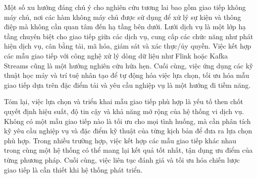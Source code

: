 Một số xu hướng đáng chú ý cho nghiên cứu tương lai bao gồm giao tiếp không máy chủ, nơi các hàm không máy chủ được sử dụng để xử lý sự kiện và thông điệp mà không cần quan tâm đến hạ tầng bên dưới. Lưới dịch vụ là một lớp hạ tầng chuyên biệt cho giao tiếp giữa các dịch vụ, cung cấp các chức năng như phát hiện dịch vụ, cân bằng tải, mã hóa, giám sát và xác thực/ủy quyền. Việc kết hợp các mẫu giao tiếp với công nghệ xử lý dòng dữ liệu như Flink hoặc Kafka Streams cũng là một hướng nghiên cứu hứa hẹn. Cuối cùng, việc ứng dụng các kỹ thuật học máy và trí tuệ nhân tạo để tự động hóa việc lựa chọn, tối ưu hóa mẫu giao tiếp dựa trên đặc điểm tải và yêu cầu nghiệp vụ là một hướng đi tiềm năng.

Tóm lại, việc lựa chọn và triển khai mẫu giao tiếp phù hợp là yếu tố then chốt quyết định hiệu suất, độ tin cậy và khả năng mở rộng của hệ thống vi dịch vụ. Không có một mẫu giao tiếp nào là tối ưu cho mọi tình huống, mà cần phân tích kỹ yêu cầu nghiệp vụ và đặc điểm kỹ thuật của từng kịch bản để đưa ra lựa chọn phù hợp. Trong nhiều trường hợp, việc kết hợp các mẫu giao tiếp khác nhau trong cùng một hệ thống có thể mang lại kết quả tốt nhất, tận dụng ưu điểm của từng phương pháp. Cuối cùng, việc liên tục đánh giá và tối ưu hóa chiến lược giao tiếp là cần thiết khi hệ thống phát triển.